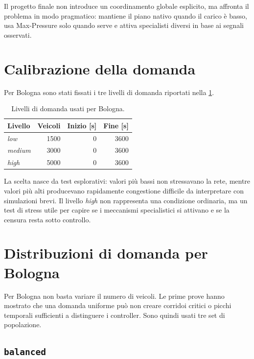 \documentclass[12pt,a4paper,oneside]{report}
\numberwithin{equation}{chapter}
\begin{document}
Il progetto finale non introduce un coordinamento globale esplicito, ma affronta
il problema in modo pragmatico: mantiene il piano nativo quando il carico è
basso, usa Max-Pressure solo quando serve e attiva specialisti diversi in base
ai segnali osservati.

\section{Calibrazione della domanda}

Per Bologna sono stati fissati i tre livelli di domanda riportati nella
\cref{tab:bologna-demand}.

\begin{table}[htbp]
    \centering
    \caption{Livelli di domanda usati per Bologna.}
    \label{tab:bologna-demand}
    \begin{tabular}{lrrr}
        \toprule
        Livello & Veicoli & Inizio [s] & Fine [s] \\
        \midrule
        \emph{low} & 1500 & 0 & 3600 \\
        \emph{medium} & 3000 & 0 & 3600 \\
        \emph{high} & 5000 & 0 & 3600 \\
        \bottomrule
    \end{tabular}
\end{table}

La scelta nasce da test esplorativi: valori più bassi non stressavano la rete,
mentre valori più alti producevano rapidamente congestione difficile da
interpretare con simulazioni brevi. Il livello \emph{high} non rappresenta una condizione
ordinaria, ma un test di stress utile per capire se i meccanismi specialistici
si attivano e se la censura resta sotto controllo.

\section{Distribuzioni di domanda per Bologna}

Per Bologna non basta variare il numero di veicoli. Le prime prove hanno
mostrato che una domanda uniforme può non creare corridoi critici o picchi
temporali sufficienti a distinguere i controller. Sono quindi usati tre set di
popolazione.

\subsection{\texttt{balanced}}
\end{document}
